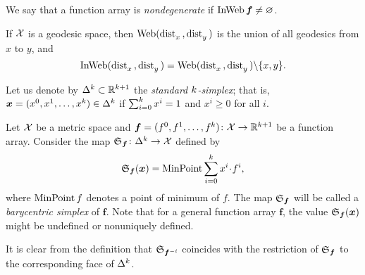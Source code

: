 We say that a function array is \emph{nondegenerate} 
if $\mathop{\rm InWeb}\nolimits\bm{f}\ne \varnothing$.

If $\mathcal{X}$ is a geodesic space, 
then $\mathop{\rm Web}\nolimits(\mathop{\rm dist}\nolimits_{x}^{{}}{}{},\mathop{\rm dist}\nolimits_{y}^{{}}{}{})$ is the union of all geodesics from $x$ to $y$, and 
\[\mathop{\rm InWeb}\nolimits(\mathop{\rm dist}\nolimits_{x}^{{}}{}{},\mathop{\rm dist}\nolimits_{y}^{{}}{}{})=\mathop{\rm Web}\nolimits(\mathop{\rm dist}\nolimits_{x}^{{}}{}{},\mathop{\rm dist}\nolimits_{y}^{{}}{}{})\backslash\{x,y\}.\]

Let us denote by $\Delta^\kay\subset \RR^{\kay+1}$ 
the \emph{standard $k$-simplex}; 
that is, $\bm{x}=(x^0,x^1,\dots,x^\kay)\in\Delta^\kay$ if $\sum_{i=0}^k x^i=1$ and $x^i\ge0$ for all $i$.

Let $\mathcal{X}$ be a metric space 
and $\bm{f}=(f^0,f^1,\dots,f^\kay)\:\spc{X}\to \RR^{\kay+1}$ be a function array.
Consider the map $\spx{\bm{f}}\:\Delta^\kay\to \spc{X}$ defined by 
\[\spx{\bm{f}}(\bm{x})=\argmin\sum_{i=0}^\kay x^i\cdot f^i,\]
where $\mathop{\rm MinPoint} f$\index{$\argmin$} denotes a point of minimum of $f$.
The map $\mathfrak{S}_{\bm{f}}$ will be called a \emph{barycentric simplex} of $\bm{f}$.
Note that for a general function array $\bm{f}$, 
the value $\mathfrak{S}_{\bm{f}}(\bm{x})$ might be undefined or nonuniquely defined.

It is clear from the definition that $\mathfrak{S}_{\bm{f}^{{-} i}}$ 
coincides with the restriction of $\mathfrak{S}_{\bm{f}}$ to the corresponding face of $\Delta^k$.


